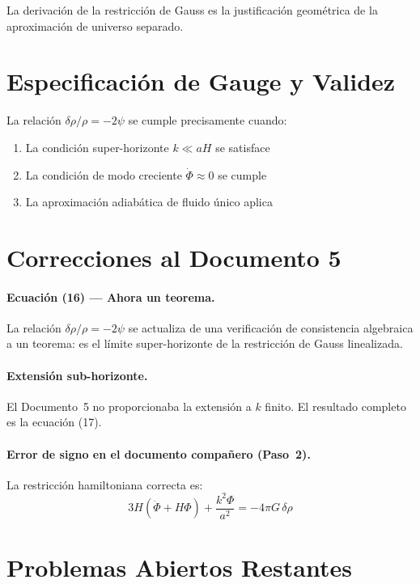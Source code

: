 \documentclass[12pt,a4paper]{article}
\begin{document}
La derivación de la restricción de Gauss es la justificación geométrica de la aproximación de universo separado.

\section{Especificación de Gauge y Validez}

La relación $\delta\rho/\rho = -2\psi$ se cumple precisamente cuando:

\begin{enumerate}
  \item La condición super-horizonte $k \ll aH$ se satisface
  \item La condición de modo creciente $\dot\Phi \approx 0$ se cumple
  \item La aproximación adiabática de fluido único aplica
\end{enumerate}

\section{Correcciones al Documento 5}

\paragraph{Ecuación (16) --- Ahora un teorema.} La relación $\delta\rho/\rho = -2\psi$ se actualiza de una verificación de consistencia algebraica a un teorema: es el límite super-horizonte de la restricción de Gauss linealizada.

\paragraph{Extensión sub-horizonte.} El Documento~5 no proporcionaba la extensión a $k$ finito. El resultado completo es la ecuación (17).

\paragraph{Error de signo en el documento compañero (Paso~2).} La restricción hamiltoniana correcta es:
\begin{equation}
3H(\dot\Phi + H\Phi) + \frac{k^2\Phi}{a^2} = -4\pi G\,\delta\rho \tag{24}
\end{equation}

\section{Problemas Abiertos Restantes}
\end{document}
